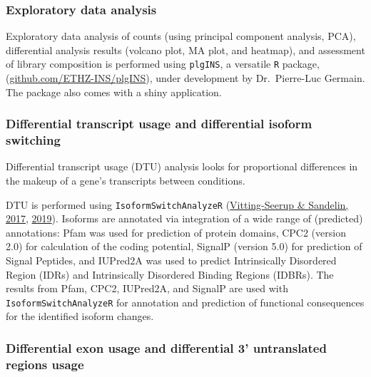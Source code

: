\documentclass[12pt,twoside]{reedthesis}
\begin{document}
\hypertarget{m3.2.4}{%
\subsubsection*{Exploratory data analysis}\label{m3.2.4}}

Exploratory data analysis of counts (using principal component analysis,
PCA), differential analysis results (volcano plot, MA plot, and
heatmap), and assessment of library composition is performed using
\texttt{plgINS}, a versatile \texttt{R} package,
(\href{https://github.com/ETHZ-INS/plgINS}{github.com/ETHZ-INS/plgINS}),
under development by Dr.~Pierre-Luc Germain. The package also comes with
a shiny application.

\hypertarget{m3.2.5}{%
\subsubsection*{Differential transcript usage and differential isoform switching}\label{m3.2.5}}

Differential transcript usage (DTU) analysis looks for proportional
differences in the makeup of a gene's transcripts between conditions.

DTU is performed using \texttt{IsoformSwitchAnalyzeR} (\protect\hyperlink{ref-vitting-seerup2017}{Vitting-Seerup \& Sandelin, 2017}, \protect\hyperlink{ref-vitting-seerup2019}{2019}). Isoforms are annotated via integration of a wide
range of (predicted) annotations: Pfam was used for prediction of
protein domains, CPC2 (version 2.0) for calculation of the coding
potential, SignalP (version 5.0) for prediction of Signal Peptides, and
IUPred2A was used to predict Intrinsically Disordered Region (IDRs) and
Intrinsically Disordered Binding Regions (IDBRs). The results from Pfam,
CPC2, IUPred2A, and SignalP are used with \texttt{IsoformSwitchAnalyzeR} for
annotation and prediction of functional consequences for the identified
isoform changes.

\hypertarget{m3.2.6}{%
\subsubsection*{Differential exon usage and differential 3' untranslated regions usage}\label{m3.2.6}}
\end{document}
